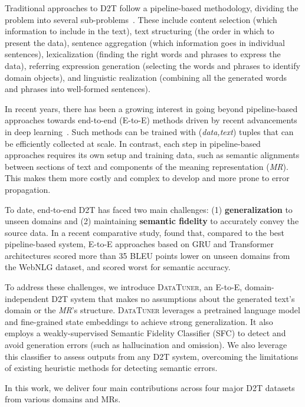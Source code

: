 \documentclass[11pt]{article}
\newcommand{\webnlg}{WebNLG\xspace}
\newcommand{\system}{\textsc{DataTuner}\xspace}
\newcommand{\mr}{\textit{MR}\xspace}
\theoremstyle{definition}
\theoremstyle{break}
\begin{document}
Traditional approaches to D2T follow a pipeline-based methodology, dividing the problem into several sub-problems~\cite{reiter2000building,gatt2018survey}. These include content selection (which information to include in the text), text structuring (the order in which to present the data), sentence aggregation (which information goes in individual sentences), lexicalization (finding the right words and phrases to express the data), referring expression generation (selecting the words and phrases to identify domain objects), and linguistic realization (combining all the generated words and phrases into well-formed sentences).

  In recent years, there has been a growing interest in going beyond pipeline-based approaches towards end-to-end (E-to-E) methods driven by recent advancements in deep learning~\cite{lebret-etal-2016-neural,novikova2017e2e,castro-ferreira-etal-2019-neural,duvsek2020evaluating}.
Such methods can be trained with (\textit{data,text}) tuples that can be efficiently collected at scale. In contrast, each step in pipeline-based approaches
requires its own setup and training data, such as semantic alignments between sections of text and components of the meaning representation (\mr). This makes them more costly and complex to develop and more prone to error propagation.

To date, end-to-end D2T has faced two main challenges: (1) \textbf{generalization} to unseen domains and (2) maintaining \textbf{semantic fidelity} to accurately convey the source data. In a recent comparative study,  found that, compared to the best pipeline-based system, E-to-E  approaches based on GRU and Transformer architectures scored more than
35 BLEU points lower on unseen domains from the \webnlg dataset, and scored worst for semantic accuracy. 


To address these challenges, we introduce \system, an E-to-E, domain-independent D2T system that makes no assumptions about the generated text's domain or the \mr 's structure. 
\system leverages a pretrained language model and fine-grained state embeddings to achieve strong generalization. It also employs a weakly-supervised Semantic Fidelity Classifier (SFC) to detect and avoid generation errors (such as hallucination and omission). We also leverage this classifier to assess outputs from any D2T system, overcoming the limitations of existing heuristic methods for detecting semantic errors.

In this work, we deliver four main contributions across four major D2T datasets from various domains and MRs. 
\end{document}
